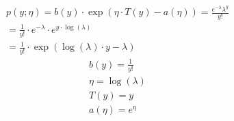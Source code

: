 \begin{answer}
\begin{eqnarray*}
p(y; \eta)=b(y)\cdot \exp(\eta\cdot T(y)-a(\eta))=\frac{e^{-\lambda}\lambda^y}{y!}\\
=\frac{1}{y!}\cdot e^{-\lambda}\cdot  e^{y\cdot\log(\lambda)}\\
=\frac{1}{y!}\cdot \exp\left(\log(\lambda)\cdot y-\lambda\right)
\end{eqnarray*}
\begin{eqnarray*}
b(y)=\frac{1}{y!}\\
\eta=\log(\lambda)\\
T(y)=y\\
a(\eta)=e^{\eta}
\end{eqnarray*}
\end{answer}
